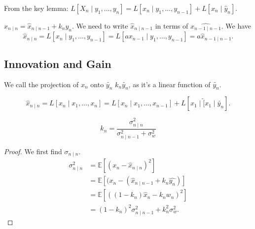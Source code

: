 \documentclass{article}
\newcommand{\EE}{\mathbb{E}}
\begin{document}
From the key lemma:
$L[X_n \mid y_1, \ldots, y_n] = L[x_n \mid y_1, \ldots, y_{n - 1}] + L[x_n \mid \hat{y}_n]$. 

$\hat{x}_{n \mid n} = \hat{x}_{n \mid n - 1} + k_n y_n$. We need to write $\hat{x}_{n \mid n-1}$ in terms of $\hat{x_{n - 1 \mid n - 1}}$. We have 
\[\hat{x}_{n \mid n} = L[x_n \mid y_1, \ldots, y_{n - 1}] = L[ax_{n - 1} \mid y_1, \ldots, y_{n-1}] = a\hat{x}_{n-1 \mid n-1}.\]

\subsection{Innovation and Gain}
We call the projection of $x_n$ onto $\tilde{y_n}$ $k_n \tilde{y_n}$, as it's a linear function of $\tilde{y_n}$.

\[\hat{x}_{n \mid n} = L[x_n \mid x_1, \ldots, x_n] = L[x_n \mid x_1, \ldots, x_{n-1}] + L[x_1 \mid \tilde[x_1 \mid \tilde{y_n}].\]

\begin{definition} 
	\[k_n = \frac{\sigma^2_{n \mid n}}{\sigma^2_{n \mid n-1} + \sigma^2_{w}}\]
\end{definition}

\begin{proof}
	We first find $\sigma_{n \mid n}$.
	\begin{align*}
		\sigma^2_{n \mid n} &= \EE[(x_n - \hat{x}_{n \mid n})^2] \\
							&= \EE[(x_n - (\hat{x}_{n \mid n-1} + k_n \hat{y_n})] \\
							&= \EE[((1 - k_n) \hat{x}_n - k_n w_n)^2] \\
							&= (1 - k_n)^2 \sigma^2_{n \mid n-1} + k_n^2 \sigma^2_{w}.
	\end{align*}
\end{proof}
\end{document}
